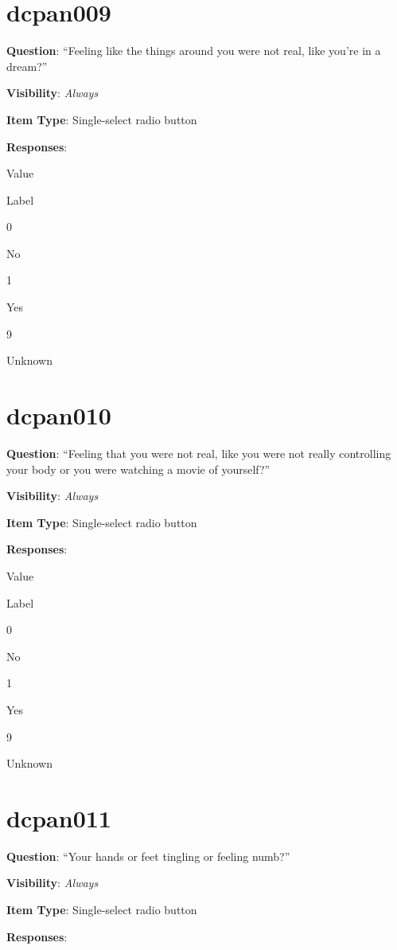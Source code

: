 \documentclass[]{book}
\begin{document}
\hypertarget{dcpan009}{%
\section{dcpan009}\label{dcpan009}}

\textbf{Question}: ``Feeling like the things around you were not real, like you're in a dream?''

\textbf{Visibility}: \emph{Always}

\textbf{Item Type}: Single-select radio button

\textbf{Responses}:

Value

Label

0

No

1

Yes

9

Unknown

\hypertarget{dcpan010}{%
\section{dcpan010}\label{dcpan010}}

\textbf{Question}: ``Feeling that you were not real, like you were not really controlling your body or you were watching a movie of yourself?''

\textbf{Visibility}: \emph{Always}

\textbf{Item Type}: Single-select radio button

\textbf{Responses}:

Value

Label

0

No

1

Yes

9

Unknown

\hypertarget{dcpan011}{%
\section{dcpan011}\label{dcpan011}}

\textbf{Question}: ``Your hands or feet tingling or feeling numb?''

\textbf{Visibility}: \emph{Always}

\textbf{Item Type}: Single-select radio button

\textbf{Responses}:
\end{document}
